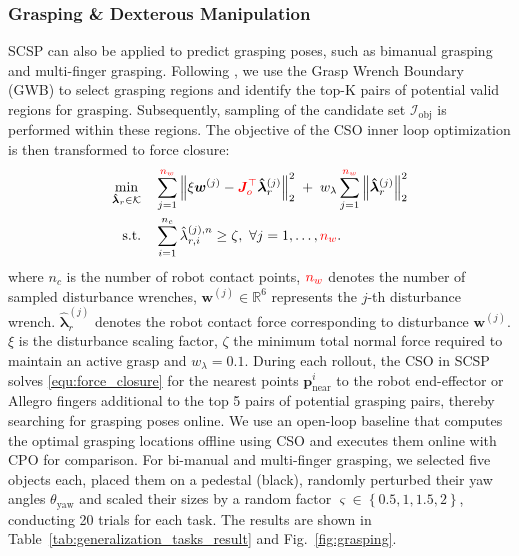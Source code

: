 \subsubsection{Grasping \& Dexterous Manipulation}
SCSP can also be applied to predict grasping poses, such as bimanual grasping and multi-finger grasping. Following \cite{lin2026bidexgrasp}, we use the Grasp Wrench Boundary (GWB) \cite{borst2004grasp} to select grasping regions and identify the top-K pairs of potential valid regions for grasping. Subsequently, sampling of the candidate set $\mathcal{I}_{\text{obj}}$ is performed within these regions. The objective of the CSO inner loop optimization is then transformed to force closure:
\begin{equation}\label{equ:force_closure}
 \begin{aligned}
\min_{\boldsymbol{\hat{\lambda}}_r \in \mathcal{K}}
\quad &
\sum_{j=1}^{\mathreplace{n_d}{n_w}} \left\| \xi \boldsymbol{w}^{(j)} - \mathreplace{\boldsymbol{J}_o}{\boldsymbol{J}_o^{\top}}\boldsymbol{\hat{\lambda}}_r^{(j)} \right\|_2^2
\;+\;
w_{\lambda} \sum_{j=1}^{\mathreplace{n_d}{n_w}} \left\| \boldsymbol{\hat{\lambda}}_r^{(j)} \right\|_2^2 \\
\text{s.t.}\quad
& \sum_{i=1}^{n_c} \hat{\lambda}_{r,i}^{(j),n} \ge \zeta, \
\forall j=1,\dots,\mathreplace{n_d}{n_w}.
\end{aligned}
\end{equation}
where $n_c$ is the number of robot contact points, $\mathreplace{n_d}{n_w}$ denotes the number of sampled disturbance wrenches, $\boldsymbol{w}^{(j)} \in \mathbb{R}^6$ represents the $j$-th disturbance wrench. $\boldsymbol{\hat{\lambda}}_r^{(j)}$ denotes the robot contact force corresponding to disturbance $\boldsymbol{w}^{(j)}$. $\xi$ is the disturbance scaling factor, $\zeta$ the minimum total normal force required to maintain an active grasp and $w_{\lambda}=0.1$. During each rollout, the CSO in SCSP solves \eqref{equ:force_closure} for the nearest points $\boldsymbol{p}_{\text{near}}^i$ to the robot end-effector or Allegro fingers additional to the top 5 pairs of potential grasping pairs, thereby searching for grasping poses online. We use an open-loop baseline that computes the optimal grasping locations offline using CSO and executes them online with CPO for comparison. For bi-manual and multi-finger grasping, we selected five objects each, placed them on a pedestal (black), randomly perturbed their yaw angles $\theta_{\text{yaw}}$ and scaled their sizes by a random factor $\varsigma \in \left \{ 0.5,1,1.5,2 \right \} $, conducting 20 trials for each task. The results are shown in Table~\ref{tab:generalization_tasks_result} and Fig.~\ref{fig:grasping}. 

